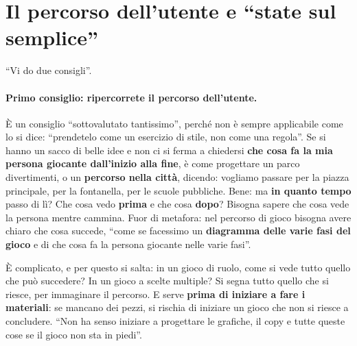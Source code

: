 \section{Il percorso dell'utente e ``state sul semplice''}
\label{a7:sec:percorso}

``Vi do due consigli''.

\paragraph{Primo consiglio: ripercorrete il percorso dell'utente.} È un consiglio
``sottovalutato tantissimo'', perché non è sempre applicabile come lo si dice:
``prendetelo come un esercizio di stile, non come una regola''. Se si hanno un sacco
di belle idee e non ci si ferma a chiedersi \textbf{che cosa fa la mia persona
giocante dall'inizio alla fine}, è come progettare un parco divertimenti, o un
\textbf{percorso nella città}, dicendo: vogliamo passare per la piazza principale,
per la fontanella, per le scuole pubbliche. Bene: ma \textbf{in quanto tempo} passo di
lì? Che cosa vedo \textbf{prima} e che cosa \textbf{dopo}? Bisogna sapere che cosa
vede la persona mentre cammina. Fuor di metafora: nel percorso di gioco bisogna avere
chiaro che cosa succede, ``come se facessimo un \textbf{diagramma delle varie fasi
del gioco} e di che cosa fa la persona giocante nelle varie fasi''.

È complicato, e per questo si salta: in un gioco di ruolo, come si vede tutto quello
che può succedere? In un gioco a scelte multiple? Si segna tutto quello che si riesce,
per immaginare il percorso. E serve \textbf{prima di iniziare a fare i materiali}: se
mancano dei pezzi, si rischia di iniziare un gioco che non si riesce a concludere.
``Non ha senso iniziare a progettare le grafiche, il copy e tutte queste cose se il
gioco non sta in piedi''.

